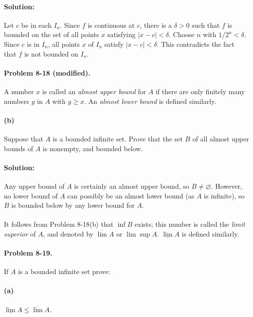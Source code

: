 \documentclass{article}
\begin{document}
\paragraph{Solution:} Let $c$ be in each $I_n$. Since $f$ is continuous at $c$,
there is a $\delta > 0$ such that $f$ is bounded on the set of all points $x$
satisfying $|x - c| < \delta$. Choose $n$ with $1/2^n < \delta$. Since $c$ is
in $I_n$, all points $x$ of $I_n$ satisfy $|x - c| < \delta$. This contradicts
the fact that $f$ is not bounded on $I_n$.

\paragraph{Problem 8-18 (modified).} A number $x$ is called an \emph{almost
upper bound} for $A$ if there are only finitely many numbers $y$ in $A$ with $y
\geq x$. An \emph{almost lower bound} is defined similarly.

\paragraph{(b)} Suppose that $A$ is a bounded infinite set. Prove that the set
$B$ of all almost upper bounds of $A$ is nonempty, and bounded below.

\paragraph{Solution:} Any upper bound of $A$ is certainly an almost upper
bound, so $B \neq \varnothing$. However, no lower bound of $A$ can possibly be
an almost lower bound (as $A$ is infinite), so $B$ is bounded below by any
lower bound for $A$.

\paragraph{} It follows from Problem 8-18(b) that $\inf B$ exists; this number
is called the \emph{limit superior} of $A$, and denoted by $\overline{\lim} A$
or $\lim \sup A$. $\underline{\lim} A$ is defined similarly.

\paragraph{Problem 8-19.} If $A$ is a bounded infinite set prove:

\paragraph{(a)} $\underline{\lim} A \leq \overline{\lim} A$.
\end{document}
